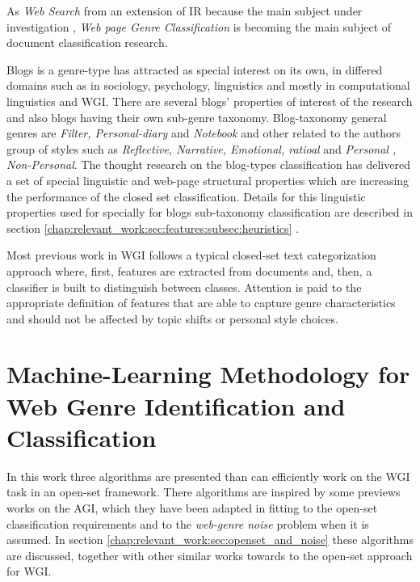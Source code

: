 As \textit{Web Search} from an extension of IR because the main subject under investigation \parencite{manning2008introduction}, \textit{Web page Genre Classification } is becoming the main subject of document classification research.

Blogs is a genre-type has attracted as special interest on its own, in differed domains such as in sociology, psychology, linguistics and mostly in computational linguistics and WGI. There are several blogs' properties of interest of the research and  also blogs having their own sub-genre taxonomy. Blog-taxonomy general genres are \textit{Filter, Personal-diary} and \textit{Notebook} and other related to the authors group of styles such as \textit{Reflective, Narrative, Emotional, ratioal} and \textit{Personal , Non-Personal}. The thought research on the blog-types classification has delivered a set of special linguistic and web-page structural properties which are increasing the performance of the closed set classification. Details for this linguistic properties used for specially for blogs sub-taxonomy classification are described in section \ref{chap:relevant_work:sec:features:subsec:heuristics} \parencite{virik2017blog,hoffmann2012cohesive,hoffmann2012cohesive,derczynski2014social,qu2006automated}. 

Most previous work in WGI follows a typical closed-set text categorization approach where, first, features are extracted from documents and, then, a classifier is built to distinguish between classes. Attention is paid to the appropriate definition of features that are able to capture genre characteristics and should not be affected by topic shifts or personal style choices. 

\section{Machine-Learning Methodology for Web Genre Identification and Classification}\label{chap:relevant_work:sec:machine_learning_methods}

In this work three algorithms are presented than can efficiently work on the WGI task in an open-set framework. There algorithms are inspired by some previews works on the AGI, which they have been adapted in fitting to the open-set classification requirements and to the \textit{web-genre noise} problem when it is assumed. In section \ref{chap:relevant_work:sec:openset_and_noise} these algorithms are discussed, together with other similar works towards to the open-set approach for WGI.

